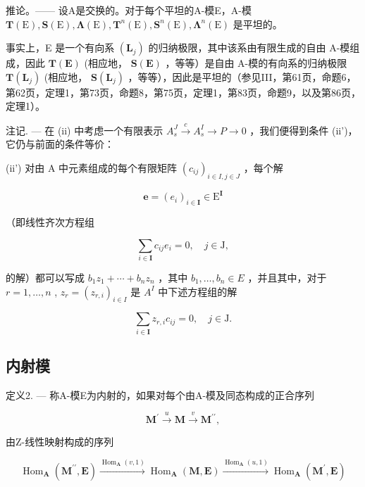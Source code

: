 \begin{enumerate}
\end{enumerate}

推论。—— 设A是交换的。对于每个平坦的A-模E，A-模 \(\mathbf{T}(\mathrm{E}),\mathbf{S}(\mathrm{E}),\symbf{\Lambda}(\mathrm{E}),\mathbf{T}^{n}(\mathrm{E}),\mathbf{S}^{n}(\mathrm{E}),\symbf{\Lambda}^{n}(\mathrm{E})\) 是平坦的。

事实上，E 是一个有向系 \((\mathbf{L}_{j})\) 的归纳极限，其中该系由有限生成的自由 A-模组成，因此 \(\mathbf{T}(\mathbf{E})\) (相应地， \(\mathbf{S}(\mathbf{E})\) ，等等）是自由 A-模的有向系的归纳极限 \(\mathbf{T}(\mathbf{L}_{j})\) (相应地， \(\mathbf{S}(\mathbf{L}_{j})\) ，等等），因此是平坦的（参见III，第61页，命题6，第62页，定理1，第73页，命题8，第75页，定理1，第83页，命题9，以及第86页，定理1）。

注记. --- 在 (ii) 中考虑一个有限表示 \(A_{s}^{J} \xrightarrow{c} A_{s}^{I} \to P \to 0\) ，我们便得到条件 (ii')，它仍与前面的条件等价：

(ii') 对由 A 中元素组成的每个有限矩阵 \((c_{ij})_{i\in I,j\in J}\) ，每个解

\[
\pmb {e} = (e _ {i}) _ {i \in \mathbf {I}} \in \mathrm{E} ^ {\mathbf {I}}
\]

（即线性齐次方程组

\[
\sum_ {i \in \mathbf {I}} c _ {i j} e _ {i} = 0, \quad j \in \mathrm{J},
\]

的解）都可以写成 \(b_{1}z_{1}+\cdots+b_{n}z_{n}\) ，其中 \(b_{1},\ldots,b_{n}\in E\) ，并且其中，对于 \(r=1,\ldots,n\) , \(z_{r}=(z_{r,i})_{i\in I}\) 是 \(A^{I}\) 中下述方程组的解

\[
\sum_ {i \in \mathbf {I}} z _ {r, i} c _ {i j} = 0, \quad j \in \mathrm{J}.
\]

\subsection{内射模}

定义2. --- 称A-模E为内射的，如果对每个由A-模及同态构成的正合序列

\[
\mathbf {M} ^ {\prime} \xrightarrow {u} \mathbf {M} \xrightarrow {v} \mathbf {M} ^ {\prime \prime},\tag{19}
\]

由Z-线性映射构成的序列

\[
\operatorname{Hom} _ {\mathbf {A}} \left(\mathbf {M} ^ {\prime \prime}, \mathbf {E}\right) \xrightarrow {\operatorname{Hom} _ {\mathbf {A}} (v , 1)} \operatorname{Hom} _ {\mathbf {A}} (\mathbf {M}, \mathbf {E}) \xrightarrow {\operatorname{Hom} _ {\mathbf {A}} (u , 1)} \operatorname{Hom} _ {\mathbf {A}} \left(\mathbf {M} ^ {\prime}, \mathbf {E}\right)\tag{20}
\]

